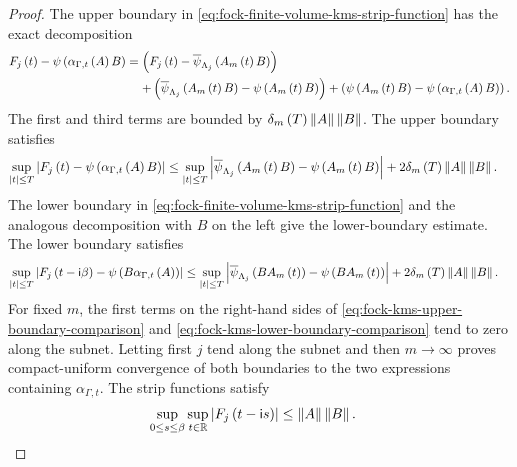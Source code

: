 \documentclass[11pt,a4paper]{article}
\theoremstyle{plain}
\theoremstyle{definition}
\theoremstyle{remark}
\begin{document}
\begin{proof}
The upper boundary in \eqref{eq:fock-finite-volume-kms-strip-function} has the exact decomposition
$$\begin{aligned}
\fun{F_j}{t}
-
\fun{\oastate[\psi]}{\fun{\alpha_{\Gamma,t}}{A}B}
& =
\rbk{
\fun{F_j}{t}
-
\fun{\oastate[\overline{\psi}_{\Lambda_j}]}{\fun{A_m}{t}B}}
\\
& \mathrel{\phantom{=}}
+
\rbk{
\fun{\oastate[\overline{\psi}_{\Lambda_j}]}{\fun{A_m}{t}B}
-
\fun{\oastate[\psi]}{\fun{A_m}{t}B}}
+
\rbk{
\fun{\oastate[\psi]}{\fun{A_m}{t}B}
-
\fun{\oastate[\psi]}{\fun{\alpha_{\Gamma,t}}{A}B}}.
\end{aligned}$$
The first and third terms are bounded by
$\delta_m \left( T \right)\left\Vert A \right\Vert\left\Vert B \right\Vert$.
The upper boundary satisfies
\begin{equation}
\begin{aligned}
\sup_{\abs{t} \leq T}
\abs{
\fun{F_j}{t}
-
\fun{\oastate[\psi]}{\fun{\alpha_{\Gamma,t}}{A}B}}
& \leq
\sup_{\abs{t} \leq T}
\abs{
\fun{\oastate[\overline{\psi}_{\Lambda_j}]}{\fun{A_m}{t}B}
-
\fun{\oastate[\psi]}{\fun{A_m}{t}B}}
+
2 \fun{\delta_m}{T} \norm{A} \norm{B}.
\end{aligned}
\label{eq:fock-kms-upper-boundary-comparison}
\end{equation}
The lower boundary in \eqref{eq:fock-finite-volume-kms-strip-function} and the analogous decomposition with
$B$ on the left give the lower-boundary estimate.
The lower boundary satisfies
\begin{equation}
\begin{aligned}
\sup_{\abs{t} \leq T}
\abs{
\fun{F_j}{t - \imunit\beta}
-
\fun{\oastate[\psi]}{B\fun{\alpha_{\Gamma,t}}{A}}}
& \leq
\sup_{\abs{t} \leq T}
\abs{
\fun{\oastate[\overline{\psi}_{\Lambda_j}]}{B\fun{A_m}{t}}
-
\fun{\oastate[\psi]}{B\fun{A_m}{t}}}
+
2 \fun{\delta_m}{T} \norm{A} \norm{B}.
\end{aligned}
\label{eq:fock-kms-lower-boundary-comparison}
\end{equation}
For fixed $m$, the first terms on the right-hand sides of
\eqref{eq:fock-kms-upper-boundary-comparison} and
\eqref{eq:fock-kms-lower-boundary-comparison} tend to zero along the subnet.
Letting first $j$ tend along the subnet and then $m \to \infty$ proves compact-uniform convergence of both
boundaries to the two expressions containing $\alpha_{\Gamma,t}$.
The strip functions satisfy
$$\begin{aligned}
\sup_{0\leq s\leq\beta}
\sup_{t\in\fldreal}
\abs{\fun{F_j}{t-\imunit s}}
& \leq
\norm{A}\norm{B}.
\end{aligned}$$

\end{proof}
\end{document}
